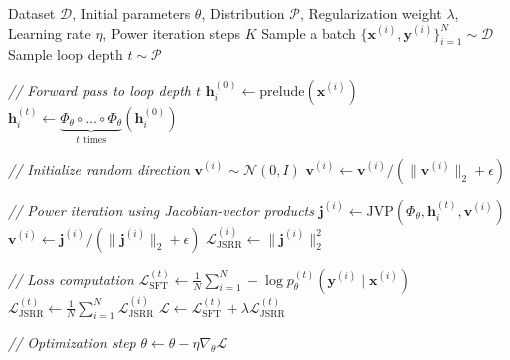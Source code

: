    
\begin{algorithm}[h]
   \caption{STARS Training for Looped Language Models with JSRR}
   \label{alg:stars_jacobian}
\begin{algorithmic}
    Dataset $\mathcal{D}$, Initial parameters $\theta$, Distribution $\mathcal{P}$, Regularization weight $\lambda$, Learning rate $\eta$, Power iteration steps $K$
   \REPEAT
   \STATE Sample a batch $\{\mathbf{x}^{(i)}, \mathbf{y}^{(i)}\}_{i=1}^N \sim \mathcal{D}$
   \STATE Sample loop depth $t \sim \mathcal{P}$

      \STATE \textit{// Forward pass to loop depth $t$}
      \STATE $\mathbf{h}^{(0)}_i \gets \text{prelude}(\mathbf{x}^{(i)})$
      \STATE $\mathbf{h}^{(t)}_i \gets \underbrace{\Phi_\theta \circ \dots \circ \Phi_\theta}_{t \text{ times}}(\mathbf{h}^{(0)}_i)$

      \STATE \textit{// Initialize random direction}
      \STATE $\mathbf{v}^{(i)} \sim \mathcal{N}(0, I)$
      \STATE $\mathbf{v}^{(i)} \gets \mathbf{v}^{(i)} / \left(\|\mathbf{v}^{(i)}\|_2 + \epsilon\right)$

      \STATE \textit{// Power iteration using Jacobian-vector products}
         \STATE $\mathbf{j}^{(i)} \gets \text{JVP}\left(\Phi_\theta, \mathbf{h}^{(t)}_i, \mathbf{v}^{(i)}\right)$
         \STATE $\mathbf{v}^{(i)} \gets \mathbf{j}^{(i)} / \left(\|\mathbf{j}^{(i)}\|_2 + \epsilon\right)$
      \ENDFOR
      \STATE $\mathcal{L}^{(i)}_{\text{JSRR}} \gets \|\mathbf{j}^{(i)}\|_2^2$
   \ENDFOR

   \STATE \textit{// Loss computation}
   \STATE $\mathcal{L}_{\text{SFT}}^{(t)} \gets \frac{1}{N} \sum_{i=1}^N -\log p_{\theta}^{(t)}(\mathbf{y}^{(i)} \mid \mathbf{x}^{(i)})$
   \STATE $\mathcal{L}_{\text{JSRR}}^{(t)} \gets \frac{1}{N} \sum_{i=1}^N \mathcal{L}^{(i)}_{\text{JSRR}}$
   \STATE $\mathcal{L} \gets \mathcal{L}_{\text{SFT}}^{(t)} + \lambda \mathcal{L}_{\text{JSRR}}^{(t)}$

   \STATE \textit{// Optimization step}
   \STATE $\theta \gets \theta - \eta \nabla_\theta \mathcal{L}$

\end{algorithmic}
\end{algorithm}

